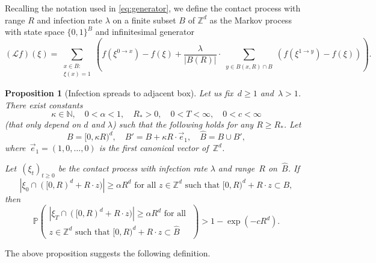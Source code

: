 \documentclass[a4paper,12pt]{article}
\newtheorem  {proposition}   [theorem]{Proposition}
\newcommand{\Z}{\mathbb{Z}}
\begin{document}
\smallskip

Recalling the notation used in \eqref{eq:generator}, we define the contact process with range $R$ and infection rate $\lambda$ on a finite subset $B$ of $\mathbb{Z}^d$
as the Markov process with state space $\{0,1\}^B$ and infinitesimal generator
\begin{equation}\label{eq:generator_on_B}
 (\mathcal{L}f)(\xi) = \sum_{\substack{x \in B:\\\xi(x) = 1}} \left( f(\xi^{0 \to x}) - f(\xi) + \frac{\lambda}{  |B(R)|} \cdot \sum_{\substack{y \in B(x,R)\cap B  }} (f(\xi^{1 \to y}) - f(\xi))\right).
\end{equation}




\begin{proposition}[Infection spreads to adjacent box]
\label{prop:growth_to_adjacent_box}
Let us fix~$d \geq 1$ and~$\lambda > 1$. There exist constants
$$\kappa \in \mathbb{N},\quad 0<\alpha<1,\quad  R_{*} > 0, \quad 0<T <\infty,\quad 0< c <\infty$$
(that only depend on $d$ and $\lambda$) such that the following holds  for any $R \geq R_*$.
Let
\begin{equation}
\label{eq:boxes12}
B = [0,\kappa R)^d,\quad B'= B+ \kappa R \cdot \vec{e}_1, \quad \widehat{B} = B \cup B',
\end{equation}
where~$\vec{e}_1=(1,0,\dots,0)$ is the first canonical vector of~$\Z^d$.

Let~$({\xi}_t)_{t \geq 0}$ be the contact process with infection rate $\lambda$ and range~$R$ on~$\widehat{B}$. If
\begin{equation}
\label{eq:initial_conf_good}
|\xi_0 \cap ([0,R)^d + R \cdot z)| \geq \alpha R^d \text{ for all $z \in \mathbb{Z}^d$ such that } [0,R)^d +R \cdot z \subset B,
\end{equation}
then
$$
\mathbb{P}\left(\begin{array}{c}
|\xi_{T} \cap ([0,R)^d + R \cdot z) | \geq \alpha R^d\text{ for all }
\\
 z \in \mathbb{Z}^d \text { such that } [0,R)^d +R \cdot z \subset \widehat{B}
\end{array}\right) > 1-\exp\left( -c R^d \right).
$$
\end{proposition}
The above proposition suggests the following definition.
\end{document}
